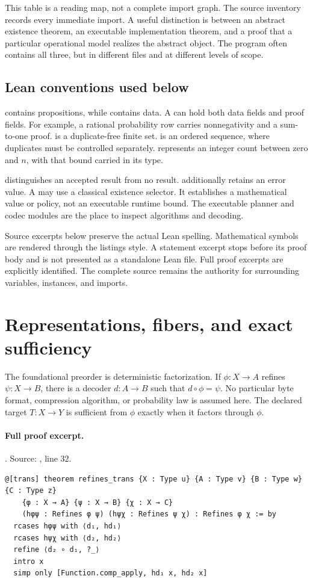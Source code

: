 \documentclass[11pt]{article}
\begin{document}
This table is a reading map, not a complete import graph. The source inventory
records every immediate import. A useful distinction is between an abstract
existence theorem, an executable implementation theorem, and a proof that a
particular operational model realizes the abstract object. The program often
contains all three, but in different files and at different levels of scope.

\subsection{Lean conventions used below}
 contains propositions, while  contains data. A
 can hold both data fields and proof fields. For example, a
rational probability row carries nonnegativity and a sum-to-one proof.
 is a duplicate-free finite set.  is an ordered sequence,
where duplicates must be controlled separately.  represents an
integer count between zero and $n$, with that bound carried in its type.

 distinguishes an accepted result from no result. 
additionally retains an error value. A  may use a
classical existence selector. It establishes a mathematical value or policy,
not an executable runtime bound. The executable planner and codec modules are
the place to inspect algorithms and decoding.

Source excerpts below preserve the actual Lean spelling. Mathematical symbols
are rendered through the listings style. A statement excerpt stops before its
proof body and is not presented as a standalone Lean file. Full proof excerpts
are explicitly identified. The complete source remains the authority for
surrounding variables, instances, and imports.

\section{Representations, fibers, and exact sufficiency}
\label{sec:fibers}
The foundational preorder is deterministic factorization. If
$\phi:X\to A$ refines $\psi:X\to B$, there is a decoder $d:A\to B$ such that
$d\circ\phi=\psi$. No particular byte format, compression algorithm, or
probability law is assumed here. The declared target $T:X\to Y$ is sufficient
from $\phi$ exactly when it factors through $\phi$.

\paragraph{Full proof excerpt.}. Source: , line 32.
\begin{lstlisting}[style=AVOCSource]
@[trans] theorem refines_trans {X : Type u} {A : Type v} {B : Type w} {C : Type z}
    {φ : X → A} {ψ : X → B} {χ : X → C}
    (hφψ : Refines φ ψ) (hψχ : Refines ψ χ) : Refines φ χ := by
  rcases hφψ with ⟨d₁, hd₁⟩
  rcases hψχ with ⟨d₂, hd₂⟩
  refine ⟨d₂ ∘ d₁, ?_⟩
  intro x
  simp only [Function.comp_apply, hd₁ x, hd₂ x]
\end{lstlisting}
\end{document}
